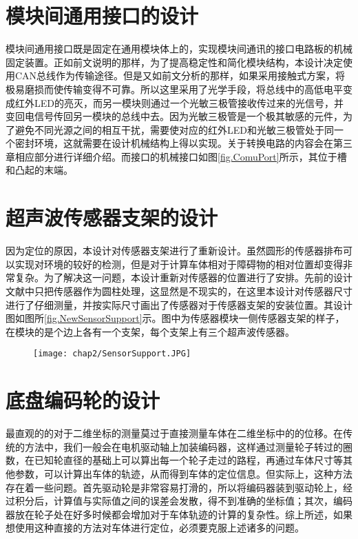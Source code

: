 \section{模块间通用接口的设计}
模块间通用接口既是固定在通用模块体上的，实现模块间通讯的接口电路板的机械固定装置。正如前文说明的那样，为了提高稳定性和简化模块结构，本设计决定使用CAN总线作为传输途径。但是又如前文分析的那样，如果采用接触式方案，将极易磨损而使传输变得不可靠。所以这里采用了光学手段，将总线中的高低电平变成红外LED的亮灭，而另一模块则通过一个光敏三极管接收传过来的光信号，并变回电信号传回另一模块的总线中去。因为光敏三极管是一个极其敏感的元件，为了避免不同光源之间的相互干扰，需要使对应的红外LED和光敏三极管处于同一个密封环境，这就需要在设计机械结构上得以实现。关于转换电路的内容会在第三章相应部分进行详细介绍。而接口的机械接口如图\ref{fig.ComuPort}所示，其位于槽和凸起的末端。
\begin{figure}
  \centering
\end{figure}
\section{超声波传感器支架的设计}
因为定位的原因，本设计对传感器支架进行了重新设计。虽然圆形的传感器排布可以实现对环境的较好的检测，但是对于计算车体相对于障碍物的相对位置却变得非常复杂。为了解决这一问题，本设计重新对传感器的位置进行了安排。先前的设计文献中只把传感器作为圆柱处理，这显然是不现实的，在这里本设计对传感器尺寸进行了仔细测量，并按实际尺寸画出了传感器对于传感器支架的安装位置。其设计图如图所\ref{fig.NewSensorSupport}示。图中为传感器模块一侧传感器支架的样子，在模块的是个边上各有一个支架，每个支架上有三个超声波传感器。
\begin{figure}[!htp]
  \centering
  \texttt{[image: chap2/SensorSupport.JPG]}
\end{figure}
\section{底盘编码轮的设计}
最直观的的对于二维坐标的测量莫过于直接测量车体在二维坐标中的的位移。在传统的方法中，我们一般会在电机驱动轴上加装编码器，这样通过测量轮子转过的圈数，在已知轮直径的基础上可以算出每一个轮子走过的路程，再通过车体尺寸等其他参数，可以计算出车体的轨迹，从而得到车体的定位信息。但实际上，这种方法存在着一些问题。首先驱动轮是非常容易打滑的，所以将编码器装到驱动轮上，经过积分后，计算值与实际值之间的误差会发散，得不到准确的坐标值；其次，编码器放在轮子处在好多时候都会增加对于车体轨迹的计算的复杂性。综上所述，如果想使用这种直接的方法对车体进行定位，必须要克服上述诸多的问题。

